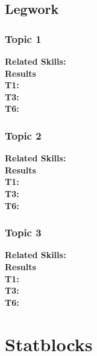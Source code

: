 \documentclass{ShadowTeXSR5}
\begin{document}
\section{Legwork}
\subsection{Topic 1}
\textbf{Related Skills:}\\
\textbf{Results}\\
\textbf{T1:}\\
\textbf{T3:}\\
\textbf{T6:}\\

\subsection{Topic 2}
\textbf{Related Skills:}\\
\textbf{Results}\\
\textbf{T1:}\\
\textbf{T3:}\\
\textbf{T6:}\\

\subsection{Topic 3}
\textbf{Related Skills:}\\
\textbf{Results}\\
\textbf{T1:}\\
\textbf{T3:}\\
\textbf{T6:}\\

\chapter{Statblocks}


\end{document}
